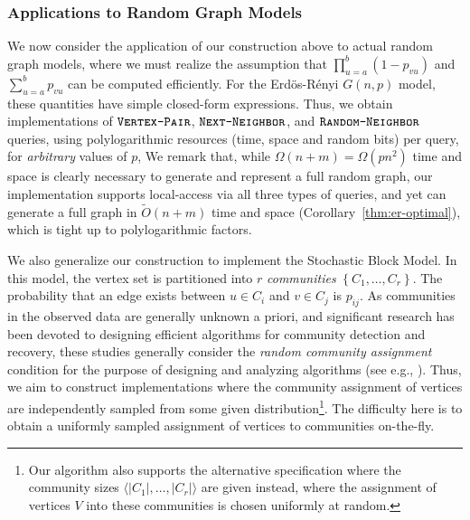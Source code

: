 \subsubsection{Applications to Random Graph Models}
\label{sec:applications_to_random_graph_models}
We now consider the application of our construction above to actual random graph models,
where we must realize the assumption that $\prod^{b}_{u=a} (1-p_{vu})$ and $\sum^{b}_{u=a} p_{vu}$ can be computed efficiently.
For the Erd\"{o}s-R\'{e}nyi $G(n,p)$ model, these quantities have simple closed-form expressions.
Thus, we obtain implementations of $\texttt{\textsc{Vertex-Pair}}$, $\texttt{\textsc{Next-Neighbor}}$, and $\texttt{\textsc{Random-Neighbor}}$ queries,
using polylogarithmic resources (time, space and random bits) per query, for \emph{arbitrary} values of $p$,
We remark that, while $\Omega(n+m) = \Omega(p n^2)$ time and space is clearly necessary to generate and represent a full random graph,
our implementation supports local-access via all three types of queries, and yet can generate a full graph in $\widetilde{O}(n+m)$ time and space
(Corollary~\ref{thm:er-optimal}), which is tight up to polylogarithmic factors.

We also generalize our construction to implement the Stochastic Block Model.
In this model, the vertex set is partitioned into $r$ \emph{communities} $\left\{ C_1, \ldots, C_r \right\}$.
The probability that an edge exists between $u\in C_i$ and $v \in C_j$ is $p_{ij}$.
As communities in the observed data are generally unknown a priori,
and significant research has been devoted to designing efficient algorithms for community detection and recovery, these studies generally consider
the \emph{random community assignment} condition for the purpose of designing and analyzing algorithms (see e.g., \cite{mossel2015reconstruction}).
Thus, we aim to construct implementations where the community assignment of vertices are independently sampled from some given distribution\footnote{
Our algorithm also supports the alternative specification where the community sizes $\langle |C_1|, \ldots, |C_r|\rangle$
are given instead, where the assignment of vertices $V$ into these communities is chosen uniformly at random.}.
The difficulty here is to obtain a uniformly sampled assignment of vertices to communities on-the-fly.

